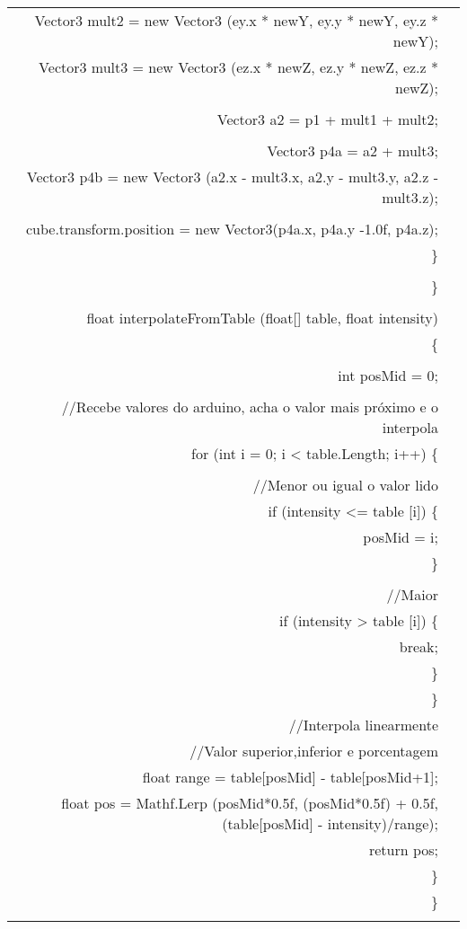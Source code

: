 \begin{longtable}{Rp{15cm}}
\quad \quad \quad Vector3 mult2 = new Vector3 (ey.x * newY, ey.y * newY, ey.z * newY);
\\            
\quad \quad \quad Vector3 mult3 = new Vector3 (ez.x * newZ, ez.y * newZ, ez.z * newZ);
\\
\\
\quad \quad \quad Vector3 a2 = p1 + mult1 + mult2;
\\
\\
\quad \quad \quad Vector3 p4a = a2 + mult3;
\\            
\quad \quad \quad Vector3 p4b = new Vector3 (a2.x - mult3.x, a2.y - mult3.y, a2.z - mult3.z);
\\
\\
\quad \quad \quad cube.transform.position = new Vector3(p4a.x, p4a.y -1.0f, p4a.z);
\\
\quad \quad	\}
\\
\\
\quad \}
\\
\\
\quad float interpolateFromTable (float[] table, float intensity)
\\
\quad \{
\\
\\
\quad \quad int posMid = 0;
\\
\\
\quad \quad //Recebe valores do arduino, acha o valor mais próximo e o interpola        
\\        
\quad \quad for (int i = 0; i < table.Length; i++) \{
\\
\\
\quad \quad \quad //Menor ou igual o valor lido
\\
\quad \quad \quad  if (intensity <= table [i]) \{
\\            
\quad \quad \quad \quad posMid = i;
\\                
\quad \quad \quad \}
\\
\\            
\quad \quad \quad //Maior
\\            
\quad \quad \quad	if (intensity > table [i]) \{
\\            
\quad \quad \quad \quad break;
\\                
\quad \quad \quad	\}
\\            
\quad \quad \}
\\        
\quad \quad	//Interpola linearmente
\\        
\quad \quad	//Valor superior,inferior e porcentagem
\\        
\quad \quad	float range = table[posMid] - table[posMid+1];
\\        
\quad \quad	float pos = Mathf.Lerp (posMid*0.5f, (posMid*0.5f) + 0.5f, (table[posMid] - intensity)/range);
\\        
\quad \quad	return pos;
\\        
\quad \}
\\    
\}
\\
\\
 \hline
 \end{longtable}
 
